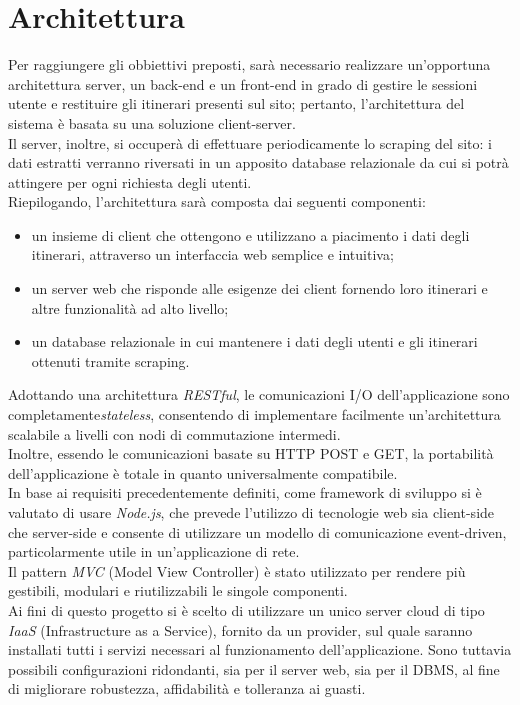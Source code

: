 \documentclass[11pt]{report}
\begin{document}
\pagebreak
\section{Architettura}
Per raggiungere gli obbiettivi preposti, sarà necessario realizzare un'opportuna architettura server, un back-end e un front-end in grado di gestire le sessioni utente e restituire gli itinerari presenti sul sito; pertanto, l'architettura del sistema è basata su una soluzione client-server.
\\Il server, inoltre, si occuperà di effettuare periodicamente lo scraping del sito: i dati estratti verranno riversati in un apposito database relazionale da cui si potrà attingere per ogni richiesta degli utenti.
\\Riepilogando, l'architettura sarà composta dai seguenti componenti:
\begin{itemize}
	\item un insieme di client che ottengono e utilizzano a piacimento i dati degli itinerari, attraverso un interfaccia web semplice e intuitiva;
	\item un server web che risponde alle esigenze dei client fornendo loro itinerari e altre funzionalità ad alto livello;
	\item un database relazionale in cui mantenere i dati degli utenti e gli itinerari ottenuti tramite scraping.
\end{itemize}
Adottando una architettura \textit{RESTful}, le comunicazioni I/O dell'applicazione sono completamente\textit{stateless}, consentendo di implementare facilmente un'architettura scalabile a livelli con nodi di commutazione intermedi.
\\Inoltre, essendo le comunicazioni basate su HTTP POST e GET, la portabilità dell'applicazione è totale in quanto universalmente compatibile.
\\In base ai requisiti precedentemente definiti, come framework di sviluppo si è valutato di usare \textit{Node.js}, che prevede l'utilizzo di tecnologie web sia client-side che server-side e consente di utilizzare un modello di comunicazione event-driven, particolarmente utile in un'applicazione di rete.
\\Il pattern \textit{MVC} (Model View Controller) è stato utilizzato per rendere più gestibili, modulari e riutilizzabili le singole componenti.
\\Ai fini di questo progetto si è scelto di utilizzare un unico server cloud di tipo \textit{IaaS} (Infrastructure as a Service), fornito da un provider, sul quale saranno installati tutti i servizi necessari al funzionamento dell'applicazione.
Sono tuttavia possibili configurazioni ridondanti, sia per il server web, sia per il DBMS, al fine di migliorare robustezza, affidabilità e tolleranza ai guasti.
\end{document}
